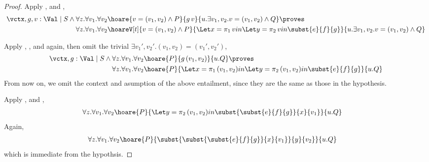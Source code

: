 \begin{proof}
  Apply ,  and
  ,
  \begin{align*}
    \vctx, g, v: \Val \mid S \wedge \forall z. \forall v_1. \forall v_2
    & \hoare{v = (v_1, v_2) \wedge P}{g\, v}
    {u.\exists v_1, v_2. v = (v_1, v_2) \wedge Q} \proves \\
    \forall z. \forall v_1. \forall v_2
    & \hoareV[t]{v = (v_1, v_2) \wedge P}
    {\Let x=\pi_1\, v in \Let y=\pi_2\, v in \subst{e}{f}{g}}
    {u. \exists v_1, v_2. v = (v_1, v_2) \wedge Q}
  \end{align*}

  Apply , , and 
  again, then omit the trivial $\exists v_1', v_2'. (v_1, v_2) = (v_1', v_2')$,
  \begin{align*}
    \vctx, g: \Val \mid S \wedge \forall z. \forall v_1. \forall v_2
    & \hoare{P}{g\, (v_1, v_2)} {u.Q} \proves \\
    \forall z. \forall v_1. \forall v_2 & \hoare{P}
    {\Let x=\pi_1\, (v_1, v_2) in \Let y=\pi_2\, (v_1, v_2) in \subst{e}{f}{g}}
    {u.Q}
  \end{align*}
  From now on, we omit the context and asumption of the above entailment,
  since they are the same as those in the hypothesis.

  Apply ,  and
  ,
  \begin{align*}
    \forall z. \forall v_1. \forall v_2 & \hoare{P}
    {\Let y=\pi_2\, (v_1, v_2) in \subst{\subst{e}{f}{g}}{x}{v_1}}{u.Q}
  \end{align*}
  Again,
  \begin{align*}
    \forall z. \forall v_1. \forall v_2 & \hoare{P}
    {\subst{\subst{\subst{e}{f}{g}}{x}{v_1}}{y}{v_2}}{u.Q}
  \end{align*}
  which is immediate from the hypothsis.
\end{proof}

